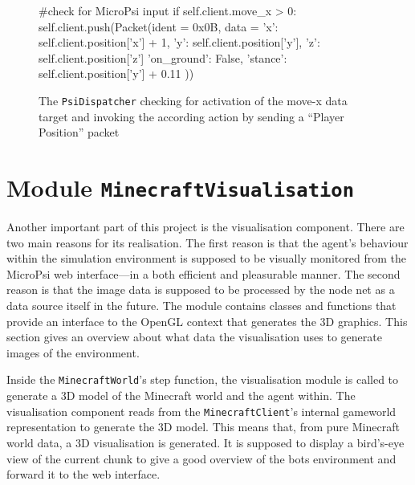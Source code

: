 		\begin{figure}[ht]
			\centering
			\begin{minipage}{11cm}
				\begin{pseudocode}
#check for MicroPsi input
if self.client.move_x > 0:
    self.client.push(Packet(ident = 0x0B, data = {
        'x': self.client.position['x'] + 1,
        'y': self.client.position['y'],
        'z': self.client.position['z']
        'on_ground': False,
        'stance': self.client.position['y'] + 0.11
        }))
					\end{pseudocode}
				\caption[The \texttt{PsiDispatcher} checking for activation of a data target]{The \texttt{PsiDispatcher} checking for activation of the move-x data target and invoking the according action by sending a ``Player Position'' packet}
				\label{listing_dispatch}
			\end{minipage}
		\end{figure}

    \section{Module \texttt{MinecraftVisualisation}}
    
Another important part of this project is the visualisation component. There are two main reasons for its realisation. The first reason is that the agent's behaviour within the simulation environment is supposed to be visually monitored from the MicroPsi web interface---in a both efficient and pleasurable manner. The second reason is that the image data is supposed to be processed by the node net as a data source itself in the future. The module contains classes and functions that provide an interface to the OpenGL context that generates the 3D graphics. This section gives an overview about what data the visualisation uses to generate images of the environment. 

Inside the \texttt{MinecraftWorld}'s step function, the visualisation module is called to generate a 3D model of the Minecraft world and the agent within. The visualisation component reads from the \texttt{MinecraftClient}'s internal gameworld representation to generate the 3D model. This means that, from pure Minecraft world data, a 3D visualisation is generated. It is supposed to display a bird's-eye view of the current chunk to give a good overview of the bots environment and forward it to the web interface.

